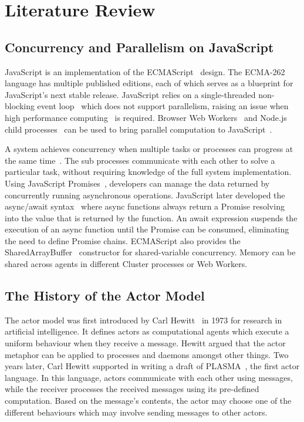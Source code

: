 \documentclass[lettersize,journal]{IEEEtran}
\begin{document}
\section{Literature Review}
\subsection{Concurrency and Parallelism on JavaScript}
JavaScript is an implementation of the ECMAScript~\cite{ecmascript} design. The ECMA-262 language has multiple published editions, each of which serves as a blueprint for JavaScript's next stable release. JavaScript relies on a single-threaded non-blocking event loop~\cite{eventloopbrowser, eventloopnode} which does not support parallelism, raising an issue when high performance computing~\cite{highperformance} is required. Browser Web Workers~\cite{webworkers} and Node.js child processes~\cite{nodejs, cluster} can be used to bring parallel computation to JavaScript~\cite{concurrencyjs, spidersjs}.

A system achieves concurrency when multiple tasks or processes can progress at the same time~\cite{concurrency}. The sub processes communicate with each other to solve a particular task, without requiring knowledge of the full system implementation. Using JavaScript Promises~\cite{promises}, developers can manage the data returned by concurrently running asynchronous operations. JavaScript later developed the async/await syntax~\cite{async} where async functions always return a Promise resolving into the value that is returned by the function. An await expression suspends the execution of an async function until the Promise can be consumed, eliminating the need to define Promise chains. ECMAScript also provides the SharedArrayBuffer~\cite{sharedarraybuffer} constructor for shared-variable concurrency. Memory can be shared across agents in different Cluster processes or Web Workers.

\subsection{The History of the Actor Model}
The actor model was first introduced by Carl Hewitt~\cite{hewitt1973session, 43years} in 1973 for research in artificial intelligence. It defines actors as computational agents which execute a uniform behaviour when they receive a message. Hewitt argued that the actor metaphor can be applied to processes and daemons amongst other things. Two years later, Carl Hewitt supported in writing a draft of PLASMA~\cite{plasma, chewitthowto}, the first actor language. In this language, actors communicate with each other using messages, while the receiver processes the received messages using its pre-defined computation. Based on the message's contents, the actor may choose one of the different behaviours which may involve sending messages to other actors.
\end{document}
